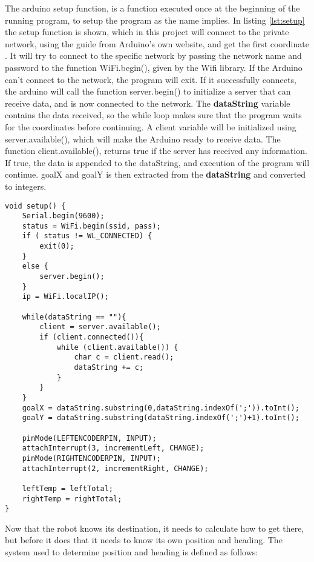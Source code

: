 The arduino setup function, is a function executed once at the beginning of the running program, to setup the program as the name implies. In listing \ref{lst:setup} the setup function is shown, which in this project will connect to the private network, using the guide from Arduino’s own website, and get the first coordinate \citep{wg}. \newline
It will try to connect to the specific network by passing the network name and password to the function WiFi.begin(), given by the Wifi library. If the Arduino can't connect to the network, the program will exit. If it successfully connects, the arduino will call the function server.begin() to initialize a server that can receive data, and is now connected to the network. \newline
The \textbf{dataString}  variable contains the data received, so the while loop makes sure that the program waits for the coordinates before continuing. A client variable will be initialized using server.available(), which will make the Arduino ready to receive data. The function client.available(), returns true if the server has received any information. If true, the data is appended to the dataString, and execution of the program will continue.
\newline
goalX and goalY is then extracted from the \textbf{dataString} and converted to integers.

\begin{lstlisting}[caption={The arduino setup function}, label={lst:setup}]
void setup() {
	Serial.begin(9600);           
	status = WiFi.begin(ssid, pass);
	if ( status != WL_CONNECTED) { 
		exit(0);
	} 
	else {
		server.begin();
	}
	ip = WiFi.localIP();
	
	while(dataString == ""){
		client = server.available();
		if (client.connected()){
			while (client.available()) {
				char c = client.read(); 
				dataString += c;
			}
		}
	}
	goalX = dataString.substring(0,dataString.indexOf(';')).toInt();
	goalY = dataString.substring(dataString.indexOf(';')+1).toInt();  
	
	pinMode(LEFTENCODERPIN, INPUT);
	attachInterrupt(3, incrementLeft, CHANGE);
	pinMode(RIGHTENCODERPIN, INPUT);
	attachInterrupt(2, incrementRight, CHANGE);
	
	leftTemp = leftTotal;
	rightTemp = rightTotal;
}
\end{lstlisting}

Now that the robot knows its destination, it needs to calculate how to get there, but before it does that it needs to know its own position and heading. The system used to determine position and heading is defined as follows:

